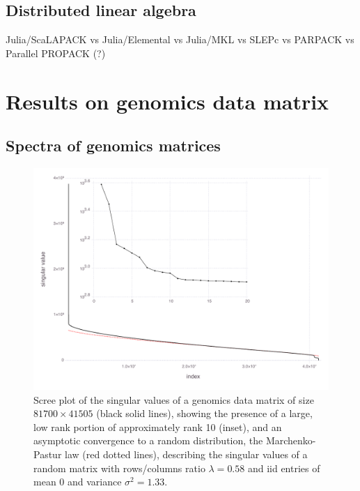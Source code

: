 \documentclass[final,leqno]{siamltex1213}
\begin{document}
\subsection{Distributed linear algebra}



Julia/ScaLAPACK vs Julia/Elemental vs Julia/MKL vs SLEPc vs PARPACK vs Parallel PROPACK (?)




\section{Results on genomics data matrix}

\subsection{Spectra of genomics matrices}

\begin{figure}
\includegraphics[width=\textwidth]{fig/scree/fig-scree.pdf}

\caption{Scree plot of the singular values of a genomics data matrix of size $81700\times41505$
(black solid lines), showing the presence of a large, low rank portion
of approximately rank 10 (inset), and an asymptotic convergence to
a random distribution, the Marchenko-Pastur law (red dotted lines),
describing the singular values of a random matrix with rows/columns
ratio $\lambda=0.58$ and iid entries of mean 0 and variance $\sigma^{2}=1.33$.}
\end{figure}
\end{document}
